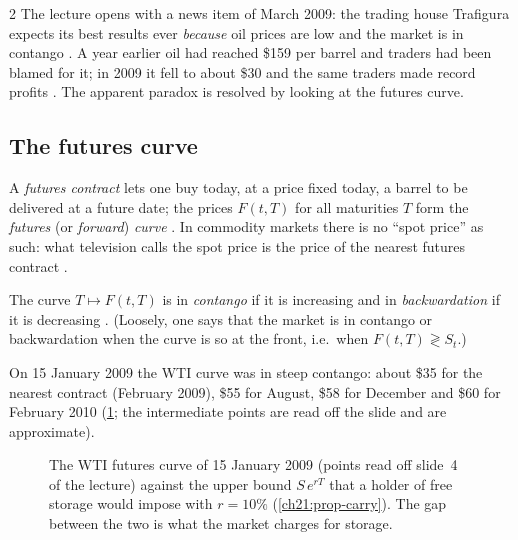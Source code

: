\begin{paracol}{2}
The lecture opens with a news item of March 2009: the trading house Trafigura expects its best results ever \emph{because} oil prices are low and the market is in contango
. A year earlier oil had reached \$159 per barrel and traders had been blamed for it; in 2009 it fell to about \$30 and the same traders made record profits
. The apparent paradox is resolved by looking at the futures curve.

\subsection{The futures curve}
A \emph{futures contract} lets one buy today, at a price fixed today, a barrel to be delivered at a future date; the prices $F(t,T)$ for all maturities $T$ form the
\emph{futures} (or \emph{forward}) \emph{curve} . In commodity markets there is no ``spot price'' as such: what television calls the spot price is the price of the
nearest futures contract .

\begin{definition}\label{ch21:def-contango}
The curve $T\mapsto F(t,T)$ is in \emph{contango} if it is increasing and in \emph{backwardation} if it is decreasing . (Loosely, one says that the market is
in contango or backwardation when the curve is so at the front, i.e.\ when $F(t,T)\gtrless S_t$.)
\end{definition}

On 15 January 2009 the WTI curve was in steep contango: about \$35 for the nearest contract (February 2009), \$55 for August, \$58 for December and \$60 for February 2010
(\cref{ch21:fig-wti}; the intermediate points are read off the slide and are approximate).

\begin{figure}[ht]
\centering
{}
\caption{The WTI futures curve of 15 January 2009 (points read off slide~4 of the lecture) against the upper bound $S\,e^{rT}$ that a holder of free storage would impose with $r=10\%$
(\cref{ch21:prop-carry}). The gap between the two is what the market charges for storage.}\label{ch21:fig-wti}
\end{figure}


\end{paracol}
